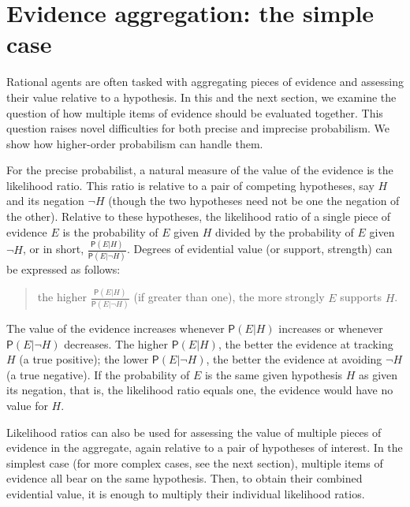 \documentclass[
  letterpaper,
  DIV=11,
  numbers=noendperiod]{scrartcl}
\newcommand{\pr}[1]{\mathsf{P}(#1)}
\begin{document}
\hypertarget{evidence-aggregation-the-simple-case}{%
\section{Evidence aggregation: the simple
case}\label{evidence-aggregation-the-simple-case}}

Rational agents are often tasked with aggregating pieces of evidence and
assessing their value relative to a hypothesis. In this and the next
section, we examine the question of how multiple items of evidence
should be evaluated together. This question raises novel difficulties
for both precise and imprecise probabilism. We show how higher-order
probabilism can handle them.

For the precise probabilist, a natural measure of the value of the
evidence is the likelihood ratio. This ratio is relative to a pair of
competing hypotheses, say \(H\) and its negation \(\neg H\) (though the
two hypotheses need not be one the negation of the other). Relative to
these hypotheses, the likelihood ratio of a single piece of evidence
\(E\) is the probability of \(E\) given \(H\) divided by the probability
of \(E\) given \(\neg H\), or in short,
\(\frac{\pr{E \vert H}}{\pr{E \vert \neg H }}\). Degrees of evidential
value (or support, strength) can be expressed as follows:

\begin{quote}
the higher $\frac{\pr{E \vert H}}{\pr{E \vert \neg H }}$ (if greater than one), the more strongly $E$ supports $H$.
\end{quote}

\noindent The value of the evidence increases whenever
\(\pr{E \vert H}\) increases or whenever \(\pr{E \vert \neg H }\)
decreases. The higher \(\pr{E \vert H}\), the better the evidence at
tracking \(H\) (a true positive); the lower \(\pr{E \vert \neg H }\),
the better the evidence at avoiding \(\neg H\) (a true negative). If the
probability of \(E\) is the same given hypothesis \(H\) as given its
negation, that is, the likelihood ratio equals one, the evidence would
have no value for \(H\).

Likelihood ratios can also be used for assessing the value of multiple
pieces of evidence in the aggregate, again relative to a pair of
hypotheses of interest. In the simplest case (for more complex cases,
see the next section), multiple items of evidence all bear on the same
hypothesis. Then, to obtain their combined evidential value, it is
enough to multiply their individual likelihood ratios.
\end{document}

